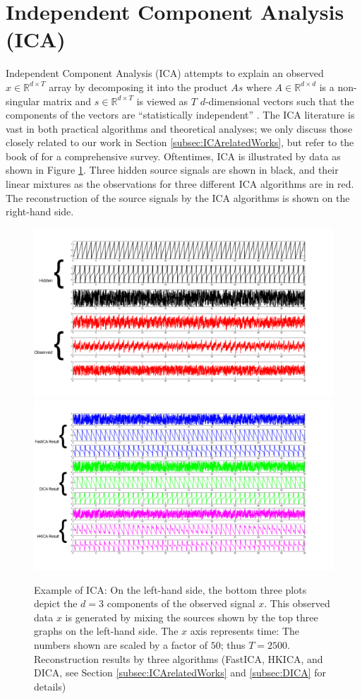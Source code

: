 \documentclass[11pt]{article}
\newcommand{\real}{\mathbb{R}}
\begin{document}
\section{Independent Component Analysis (ICA)}
\label{sec:ICA}
Independent Component Analysis (ICA) attempts to explain an observed $x\in \real^{d\times T}$ array by decomposing it into the product $As$ where $A\in \real^{d\times d}$ is a non-singular matrix and $s\in \real^{d\times T}$ is viewed as $T$ $d$-dimensional vectors such that the components of the vectors are ``statistically independent'' \citep{HyKaOj01}.
The ICA literature is vast in both practical algorithms and theoretical analyses; 
we only discuss those closely related to our work in Section \ref{subsec:ICArelatedWorks}, but refer to the book of \citet{comon2010handbook} for a comprehensive survey.
Oftentimes, ICA is illustrated by data as shown in Figure \ref{fig:demo}. Three hidden source signals are shown in black, and their linear mixtures as the observations for three different ICA algorithms are in red. The reconstruction of the source signals by the ICA algorithms is shown on the right-hand side.
\begin{figure}[t]
	\centering
	\includegraphics[width = 0.49\linewidth]{images/demo_source}
	\includegraphics[width = 0.49\linewidth]{images/demo_res}
	\caption[Example of ICA]{Example of ICA: On the left-hand side, the bottom three plots depict the $d=3$ components of the observed signal $x$. 
		This observed data $x$ is generated by mixing the sources shown by the top three graphs on the left-hand side.
		The $x$ axis represents time: The numbers shown are scaled by a factor of $50$; thus $T=2500$.
		Reconstruction results by three algorithms (FastICA, HKICA, and DICA, see Section \ref{subsec:ICArelatedWorks} and \ref{subsec:DICA} for details)}
	\label{fig:demo}
\end{figure}
\end{document}
